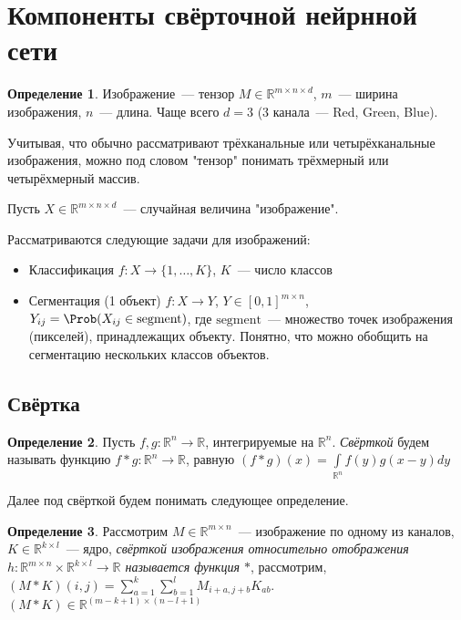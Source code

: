 \documentclass{article}
\theoremstyle{definition}
\newtheorem{definition}{Определение}
\theoremstyle{theorem}
\theoremstyle{remark}
\theoremstyle{theorem}
\theoremstyle{example}
\theoremstyle{theorem}
\theoremstyle{theorem}
\theoremstyle{theorem}
\theoremstyle{theorem}
\begin{document}
\tableofcontents

\newpage

\section{ Компоненты свёрточной нейрнной сети}
	\begin{definition}
		Изображение~--- тензор $M\in\mathbb R^{m\times n\times d}$, $m$~--- ширина изображения, $n$~--- длина. Чаще всего $d=3$ (3 канала~--- Red, Green, Blue). 
	\end{definition}
	Учитывая, что обычно рассматривают трёхканальные или четырёхканальные изображения, можно под словом "тензор" понимать трёхмерный или четырёхмерный массив.
	
	Пусть $X \in\mathbb R^{m\times n\times d}$~--- случайная величина "изображение".
	
	Рассматриваются следующие задачи для изображений:
	\begin{itemize}
		\item Классификация $f:X\to\{1,\ldots,K\}$, $K$~--- число классов
		\item Сегментация (1 объект) $f:X\to Y$, $Y\in[0,1]^{m\times n}$, $Y_{ij}=\Prob(X_{ij}\in\text{segment})$, где $\text{segment}$~--- множество точек изображения (пикселей), принадлежащих объекту. Понятно, что можно обобщить на  сегментацию нескольких классов объектов.
	\end{itemize}
	\subsection{Свёртка}
		\begin{definition}
			Пусть $f,g:\mathbb R^n\to\mathbb R$, интегрируемые на $\mathbb R^n$. \textit{Свёрткой} будем называть функцию $f*g:\mathbb R^n\to\mathbb R$, равную $(f*g)(x)=\int\limits_{\mathbb R^n}f(y)g(x-y)dy$
		\end{definition}
		
		Далее под свёрткой будем понимать следующее определение.
		
		\begin{definition}
		Рассмотрим $M\in\mathbb{R}^{m\times n}$~--- изображение по одному из каналов, $K\in\mathbb R^{k\times l}$~--- ядро, \textit{свёрткой изображения относительно отображения $h:\mathbb{R}^{m\times n}\times\mathbb R^{k\times l}\to\mathbb R$ называется функция $*$}, рассмотрим, $(M*K)(i,j)=\sum\limits_{a=1}^k\sum\limits_{b=1}^l M_{i+a,j+b}K_{ab}$. $(M*K)\in\mathbb R^{(m-k+1)\times(n-l+1)}$
	\end{definition}
	
\end{document}
